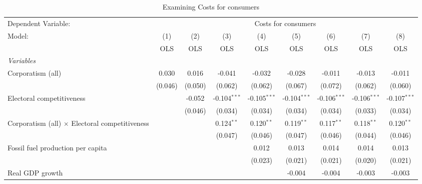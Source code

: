 
\begin{table}[htbp]
   \caption{Examining Costs for consumers}
   \centering
   \begin{tabular}{lcccccccc}
      \toprule
      Dependent Variable: & \multicolumn{8}{c}{Costs for consumers}\\
      Model:                                                & (1)     & (2)     & (3)            & (4)            & (5)            & (6)            & (7)            & (8)\\  
                                                            &  OLS    & OLS     & OLS            & OLS            & OLS            & OLS            & OLS            & OLS\\  
      \midrule
      \emph{Variables}\\
      Corporatism (all)                                     & 0.030   & 0.016   & -0.041         & -0.032         & -0.028         & -0.011         & -0.013         & -0.011\\   
                                                            & (0.046) & (0.050) & (0.062)        & (0.062)        & (0.067)        & (0.072)        & (0.062)        & (0.060)\\   
      Electoral competitiveness                             &         & -0.052  & -0.104$^{***}$ & -0.105$^{***}$ & -0.104$^{***}$ & -0.106$^{***}$ & -0.106$^{***}$ & -0.107$^{***}$\\   
                                                            &         & (0.046) & (0.034)        & (0.034)        & (0.034)        & (0.034)        & (0.033)        & (0.034)\\   
      Corporatism (all) $\times$ Electoral competitiveness  &         &         & 0.124$^{**}$   & 0.120$^{**}$   & 0.119$^{**}$   & 0.117$^{**}$   & 0.118$^{**}$   & 0.120$^{**}$\\   
                                                            &         &         & (0.047)        & (0.046)        & (0.047)        & (0.046)        & (0.044)        & (0.046)\\   
      Fossil fuel production per capita                     &         &         &                & 0.012          & 0.013          & 0.014          & 0.014          & 0.013\\   
                                                            &         &         &                & (0.023)        & (0.021)        & (0.021)        & (0.020)        & (0.021)\\   
      Real GDP growth                                       &         &         &                &                & -0.004         & -0.004         & -0.003         & -0.003\\   

\end{tabular}
\end{table}
